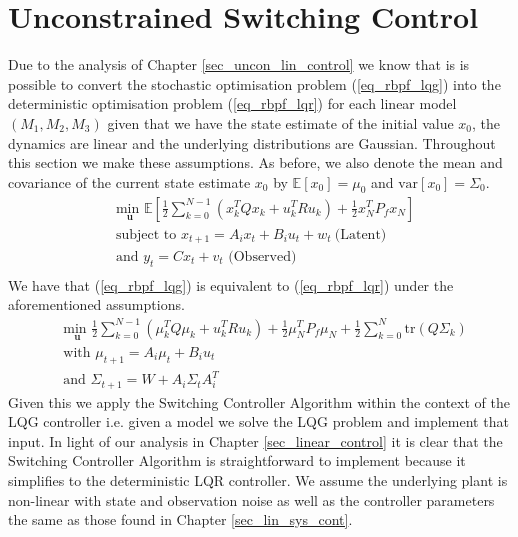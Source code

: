 \section{Unconstrained Switching Control}
\label{sec_rbpf_control_uncon}
Due to the analysis of Chapter \ref{sec_uncon_lin_control} we know that is is possible to convert the stochastic optimisation problem (\ref{eq_rbpf_lqg}) into the deterministic optimisation problem (\ref{eq_rbpf_lqr}) for each linear model $(M_1, M_2, M_3)$ given that we have the state estimate of the initial value $x_0$, the dynamics are linear and the underlying distributions are Gaussian. Throughout this section we make these assumptions. As before, we also denote the mean and covariance of the current state estimate $x_0$ by $\mathbb{E}[x_0]=\mu_0$ and $\text{var}[x_0]=\Sigma_0$.
\begin{equation}
\begin{aligned}
&\underset{\mathbf{u}}{\text{min }} \mathbb{E}\left[ \frac{1}{2}\sum_{k=0}^{N-1} \left( x_k^TQx_k + u_k^TRu_k \right) + \frac{1}{2}x_N^TP_fx_N \right] \\
& \text{subject to } x_{t+1}=A_ix_t+B_iu_t + w_t~\text{(Latent)} \\
& \text{and } y_{t}= Cx_t + v_t \text{ (Observed)}\\
\end{aligned}
\label{eq_rbpf_lqg}
\end{equation}
We have that (\ref{eq_rbpf_lqg}) is equivalent to (\ref{eq_rbpf_lqr}) under the aforementioned assumptions.
\begin{equation}
\begin{aligned}
&\underset{\mathbf{u}}{\text{min }} \frac{1}{2}\sum_{k=0}^{N-1} \left( \mu_k^TQ\mu_k + u_k^TRu_k \right) + \frac{1}{2}\mu_N^TP_f\mu_N + \frac{1}{2}\sum_{k=0}^N \text{tr}(Q\Sigma_k) \\
&\text{with } \mu_{t+1} = A_i\mu_t +B_iu_t \\
&\text{and } \Sigma_{t+1} = W+A_i\Sigma_t A_i^T 
\end{aligned}
\label{eq_rbpf_lqr}
\end{equation}
Given this we apply the Switching Controller Algorithm within the context of the LQG controller i.e. given a model we solve the LQG problem and implement that input. In light of our analysis in Chapter \ref{sec_linear_control} it is clear that the Switching Controller Algorithm is straightforward to implement because it simplifies to the deterministic LQR controller. We assume the underlying plant is non-linear with state and observation noise as well as the controller parameters the same as those found in Chapter \ref{sec_lin_sys_cont}.

